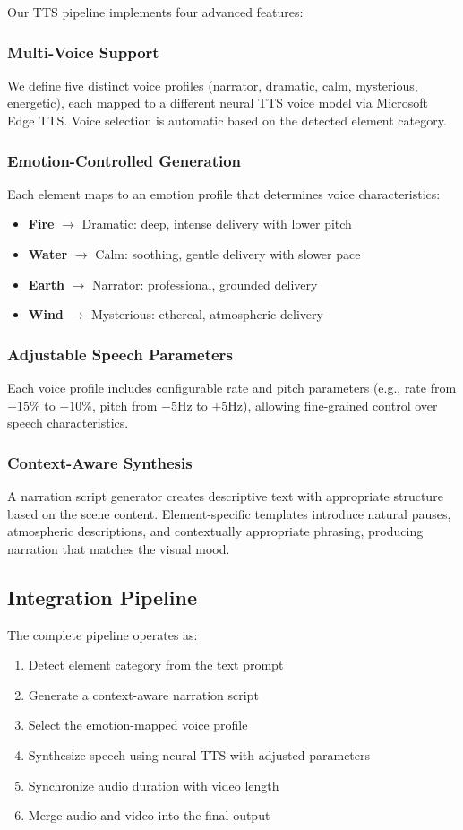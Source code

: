 \documentclass[conference]{IEEEtran}
\begin{document}
Our TTS pipeline implements four advanced features:

\subsubsection{Multi-Voice Support}
We define five distinct voice profiles (narrator, dramatic, calm, mysterious, energetic), each mapped to a different neural TTS voice model via Microsoft Edge TTS. Voice selection is automatic based on the detected element category.

\subsubsection{Emotion-Controlled Generation}
Each element maps to an emotion profile that determines voice characteristics:
\begin{itemize}
    \item \textbf{Fire} $\to$ Dramatic: deep, intense delivery with lower pitch
    \item \textbf{Water} $\to$ Calm: soothing, gentle delivery with slower pace
    \item \textbf{Earth} $\to$ Narrator: professional, grounded delivery
    \item \textbf{Wind} $\to$ Mysterious: ethereal, atmospheric delivery
\end{itemize}

\subsubsection{Adjustable Speech Parameters}
Each voice profile includes configurable rate and pitch parameters (e.g., rate from $-15\%$ to $+10\%$, pitch from $-5$Hz to $+5$Hz), allowing fine-grained control over speech characteristics.

\subsubsection{Context-Aware Synthesis}
A narration script generator creates descriptive text with appropriate structure based on the scene content. Element-specific templates introduce natural pauses, atmospheric descriptions, and contextually appropriate phrasing, producing narration that matches the visual mood.

\subsection{Integration Pipeline}
The complete pipeline operates as:
\begin{enumerate}
    \item Detect element category from the text prompt
    \item Generate a context-aware narration script
    \item Select the emotion-mapped voice profile
    \item Synthesize speech using neural TTS with adjusted parameters
    \item Synchronize audio duration with video length
    \item Merge audio and video into the final output
\end{enumerate}
\end{document}
